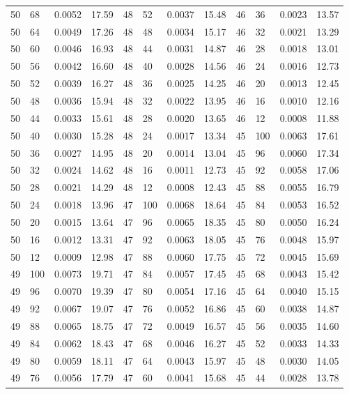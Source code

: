 \begin{tabular}{llll|llll|llll}
50 & 68 & 0.0052 & 17.59 & 48 & 52 & 0.0037 & 15.48 & 46 & 36 & 0.0023 & 13.57\\
50 & 64 & 0.0049 & 17.26 & 48 & 48 & 0.0034 & 15.17 & 46 & 32 & 0.0021 & 13.29\\
50 & 60 & 0.0046 & 16.93 & 48 & 44 & 0.0031 & 14.87 & 46 & 28 & 0.0018 & 13.01\\
50 & 56 & 0.0042 & 16.60 & 48 & 40 & 0.0028 & 14.56 & 46 & 24 & 0.0016 & 12.73\\
50 & 52 & 0.0039 & 16.27 & 48 & 36 & 0.0025 & 14.25 & 46 & 20 & 0.0013 & 12.45\\
50 & 48 & 0.0036 & 15.94 & 48 & 32 & 0.0022 & 13.95 & 46 & 16 & 0.0010 & 12.16\\
50 & 44 & 0.0033 & 15.61 & 48 & 28 & 0.0020 & 13.65 & 46 & 12 & 0.0008 & 11.88\\
50 & 40 & 0.0030 & 15.28 & 48 & 24 & 0.0017 & 13.34 & 45 & 100 & 0.0063 & 17.61\\
50 & 36 & 0.0027 & 14.95 & 48 & 20 & 0.0014 & 13.04 & 45 & 96 & 0.0060 & 17.34\\
50 & 32 & 0.0024 & 14.62 & 48 & 16 & 0.0011 & 12.73 & 45 & 92 & 0.0058 & 17.06\\
50 & 28 & 0.0021 & 14.29 & 48 & 12 & 0.0008 & 12.43 & 45 & 88 & 0.0055 & 16.79\\
50 & 24 & 0.0018 & 13.96 & 47 & 100 & 0.0068 & 18.64 & 45 & 84 & 0.0053 & 16.52\\
50 & 20 & 0.0015 & 13.64 & 47 & 96 & 0.0065 & 18.35 & 45 & 80 & 0.0050 & 16.24\\
50 & 16 & 0.0012 & 13.31 & 47 & 92 & 0.0063 & 18.05 & 45 & 76 & 0.0048 & 15.97\\
50 & 12 & 0.0009 & 12.98 & 47 & 88 & 0.0060 & 17.75 & 45 & 72 & 0.0045 & 15.69\\
49 & 100 & 0.0073 & 19.71 & 47 & 84 & 0.0057 & 17.45 & 45 & 68 & 0.0043 & 15.42\\
49 & 96 & 0.0070 & 19.39 & 47 & 80 & 0.0054 & 17.16 & 45 & 64 & 0.0040 & 15.15\\
49 & 92 & 0.0067 & 19.07 & 47 & 76 & 0.0052 & 16.86 & 45 & 60 & 0.0038 & 14.87\\
49 & 88 & 0.0065 & 18.75 & 47 & 72 & 0.0049 & 16.57 & 45 & 56 & 0.0035 & 14.60\\
49 & 84 & 0.0062 & 18.43 & 47 & 68 & 0.0046 & 16.27 & 45 & 52 & 0.0033 & 14.33\\
49 & 80 & 0.0059 & 18.11 & 47 & 64 & 0.0043 & 15.97 & 45 & 48 & 0.0030 & 14.05\\
49 & 76 & 0.0056 & 17.79 & 47 & 60 & 0.0041 & 15.68 & 45 & 44 & 0.0028 & 13.78\\

\end{tabular}
